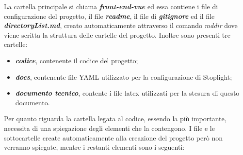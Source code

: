 La cartella principale si chiama \textbf{\textit{front-end-vue}} ed essa contiene i file di configurazione del progetto, il file \textbf{\textit{readme}}, il file di \textbf{\textit{gitignore}} ed il file \textbf{\textit{directoryList.md}}, creato automaticamente attraverso il comando \textit{mddir} dove viene scritta la struttura delle cartelle del progetto. Inoltre sono presenti tre cartelle:
\begin{itemize}
	\item \textbf{\textit{codice}}, contenente il codice del progetto;
	\item \textbf{\textit{docs}}, contenente file YAML utilizzato per la configurazione di Stoplight;
	\item \textbf{\textit{documento tecnico}}, contente i file latex utilizzati per la stesura di questo documento.
\end{itemize} 
Per quanto riguarda la cartella legata al codice, essendo la più importante, necessita di una spiegazione degli elementi che la contengono. I file e le sottocartelle create automaticamente alla creazione del progetto però non verranno spiegate, mentre i restanti elementi sono i seguenti:

